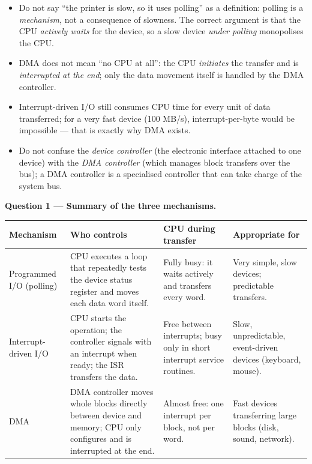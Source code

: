 \documentclass[11pt]{article}
\newcounter{popsec}
\newcounter{popsub}
\newcommand{\courssub}[1]{%
  \stepcounter{popsub}%
  \par\vspace{9pt}\noindent{\popxbold\fontsize{11.5}{13}\selectfont\color{popink}{\color{poporange}\thepopsec.\thepopsub}\hspace{6pt}#1}\par\nopagebreak\vspace{4pt}
}
\begin{document}
\begin{attention}
\begin{itemize}
\item Do not say ``the printer is slow, so it uses polling'' as a definition: polling is a \emph{mechanism}, not a consequence of slowness. The correct argument is that the CPU \emph{actively waits} for the device, so a slow device \emph{under polling} monopolises the CPU.
\item DMA does not mean ``no CPU at all'': the CPU \emph{initiates} the transfer and is \emph{interrupted at the end}; only the data movement itself is handled by the DMA controller.
\item Interrupt-driven I/O still consumes CPU time for every unit of data transferred; for a very fast device (100 MB/s), interrupt-per-byte would be impossible --- that is exactly why DMA exists.
\item Do not confuse the \emph{device controller} (the electronic interface attached to one device) with the \emph{DMA controller} (which manages block transfers over the bus); a DMA controller is a specialised controller that can take charge of the system bus.
\end{itemize}
\end{attention}

\courssub{Model answer}

\textbf{Question 1 --- Summary of the three mechanisms.}

\begin{center}
\begin{tabularx}{\linewidth}{|l|X|X|X|}
\hline
\rowcolor{popblueL} \textbf{Mechanism} & \textbf{Who controls} & \textbf{CPU during transfer} & \textbf{Appropriate for} \\
\hline
Programmed I/O (polling) & CPU executes a loop that repeatedly tests the device status register and moves each data word itself. & Fully busy: it waits actively and transfers every word. & Very simple, slow devices; predictable transfers. \\
\hline
Interrupt-driven I/O & CPU starts the operation; the controller signals with an interrupt when ready; the ISR transfers the data. & Free between interrupts; busy only in short interrupt service routines. & Slow, unpredictable, event-driven devices (keyboard, mouse). \\
\hline
DMA & DMA controller moves whole blocks directly between device and memory; CPU only configures and is interrupted at the end. & Almost free: one interrupt per block, not per word. & Fast devices transferring large blocks (disk, sound, network). \\
\hline
\end{tabularx}
\end{center}
\end{document}
